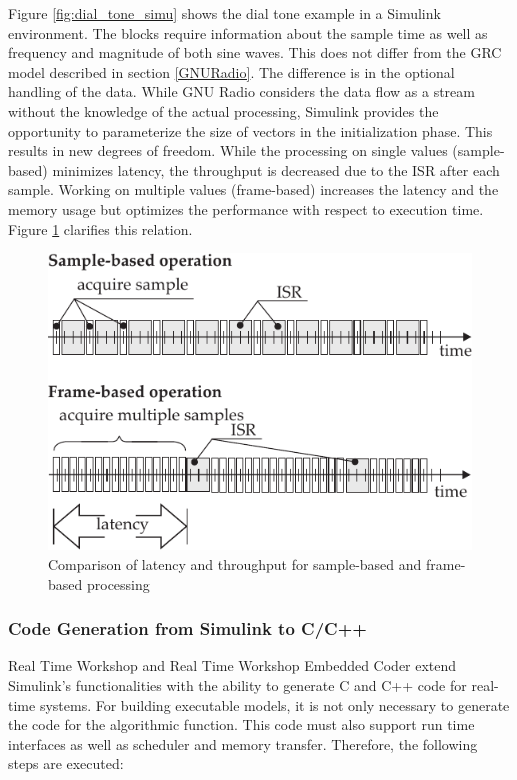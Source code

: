 Figure \ref{fig:dial_tone_simu} shows the dial tone example in a Simulink environment. The blocks require information about the sample time as well as frequency and magnitude of both sine waves. This does not differ from the \ac{GRC} model described in section \ref{GNURadio}. The difference is in the optional handling of the data. While GNU Radio considers the data flow as a stream without the knowledge of the actual processing, Simulink provides the opportunity to parameterize the size of vectors in the initialization phase. This results in new degrees of freedom. While the processing on single values (sample-based) minimizes latency, the throughput is decreased due to the \ac{ISR} after each sample. Working on multiple values (frame-based) increases the latency and the memory usage but optimizes the performance with respect to execution time. Figure \ref{fig:sample_frame} clarifies this relation.

\begin{figure}
	\centering
		\includegraphics{../kapitel02/figures/sample_frame.pdf}
	\caption{Comparison of latency and throughput for sample-based and frame-based processing}
	\label{fig:sample_frame}
\end{figure}


\subsubsection{Code Generation from Simulink to C/C++}
\label{sec:codegen}
Real Time Workshop \cite{rtw_ug} and Real Time Workshop Embedded Coder \cite{rtwec_ug} extend Simulink's functionalities with the ability to generate C and C++ code for real-time systems. For building executable models, it is not only necessary to generate the code for the algorithmic function. This code must also support run time interfaces as well as scheduler and memory transfer. Therefore, the following steps are executed:


